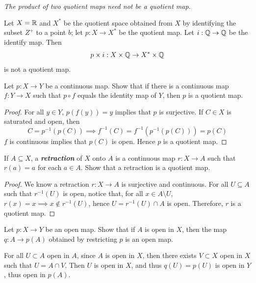 \documentclass[12pt,a4paper]{article}
\begin{document}
    \begin{eg}
        \textit{The product of two quotient maps need not be a quotient map.}
        
        Let $X=\mathbb{R}$ and $X^*$ be the quotient space obtained from $X$ by identifying the subset $Z^+$ to a point $b$; let $p:X\to X^*$ be the quotient map. Let $i:\mathbb{Q}\to\mathbb{Q}$ be the identify map. Then 
        $$
        p\times i: X\times \mathbb{Q}\to X^*\times\mathbb{Q}
        $$
        is not a quotient map.
    \end{eg}
    \hfill

    \begin{ex}
        Let $p:X\to Y$ be a continuous map. Show that if there is a continuous map $f:Y\to X$ such that $p\circ f$ equals the identity map of $Y$, then $p$ is a quotient map.
    \end{ex}
    \begin{proof}
        For all $y\in Y$, $p(f(y))=y$ implies that $p$ is surjective. If $C\in X$ is saturated and open, then
        $$
        C=p^{-1}(p(C))\implies f^{-1}(C)=f^{-1}(p^{-1}(p(C)))=p(C)
        $$
        $f$ is continuous implies that $p(C)$ is open. Hence $p$ is a quotient map.
    \end{proof}
    \hfill

    \begin{ex}
        If $A\subseteq X$, a \textbf{\textit{retraction}} of $X$ onto $A$ is a continuous map $r: X\to A$ such that $r(a)=a$ for each $a\in A$. Show that a retraction is a quotient map.
    \end{ex}
    \begin{proof}
        We know a retraction $r: X\to A$ is surjective and continuous. For all $U\subseteq A$ such that $r^{-1}(U)$ is open, notice that, for all $x\in A\setminus U$, $r(x)=x\implies x\notin r^{-1}(U)$, hence $U=r^{-1}(U)\cap A$ is open. Therefore, $r$ is a quotient map.
    \end{proof}
    \hfill

    \begin{ex}
        Let $p:X\to Y$ be an open map. Show that if $A$ is open in $X$, then the map $q: A\to p(A)$ obtained by restricting $p$ is an open map.
    \end{ex}
    \begin{remark}
        For all $U\subset A$ open in $A$, since $A$ is open in $X$, then there exists $V\subset X$ open in $X$ such that $U=A\cap V$. Then $U$ is open in $X$, and thus $q(U)=p(U)$ is open in $Y$, thus open in $p(A)$.
    \end{remark}
    \hfill
\end{document}
